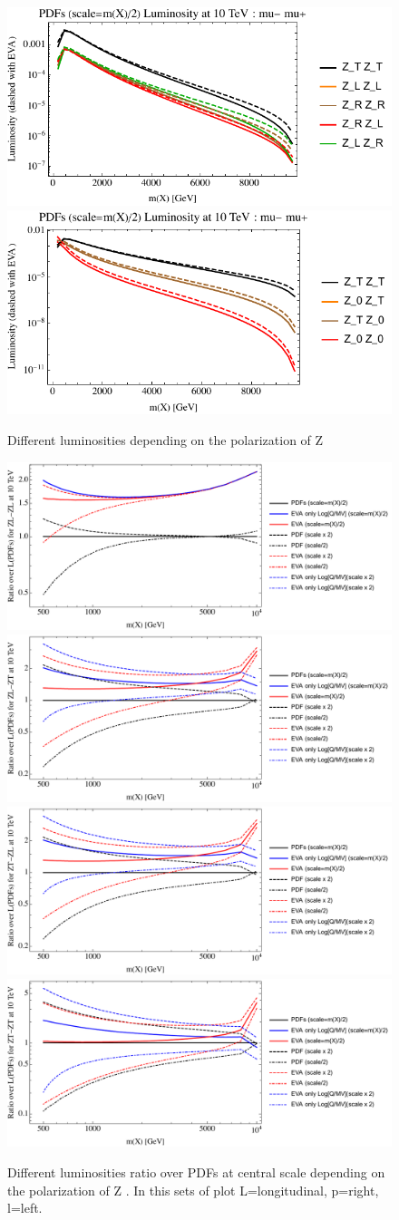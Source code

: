 \documentclass[a4paper,11pt]{article}
\begin{document}
\begin{figure}[!t]
\includegraphics[width=0.46\linewidth]{Notebooks/PlotLumi/10TeV/lumis/plotZZpolRandL.pdf}
\includegraphics[width=0.46\linewidth]{Notebooks/PlotLumi/10TeV/lumis/plotZZpolTand0.pdf}
\caption{Different luminosities depending on the polarization of Z \label{fig:lumiZZpol}}
\end{figure}





\begin{figure}[!t]
\includegraphics[width=0.46\linewidth]{Notebooks/PlotLumi/10TeV/ratios/ZL-ZL.pdf}
\includegraphics[width=0.46\linewidth]{Notebooks/PlotLumi/10TeV/ratios/ZL-ZT.pdf}
\includegraphics[width=0.46\linewidth]{Notebooks/PlotLumi/10TeV/ratios/ZT-ZL.pdf}
\includegraphics[width=0.46\linewidth]{Notebooks/PlotLumi/10TeV/ratios/ZT-ZT.pdf}
\caption{Different luminosities ratio over PDFs at central scale depending on the polarization of Z \label{fig:lumiratioZZpol}. In this sets of plot L=longitudinal, p=right, l=left.}
\end{figure}
\end{document}
